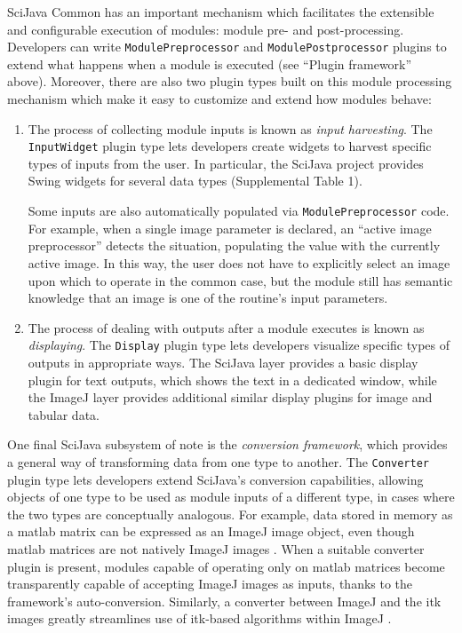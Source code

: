 \documentclass{bmcart}
\begin{document}
SciJava Common has an important mechanism which facilitates the extensible and
configurable execution of modules: module pre- and post-processing. Developers
can write \texttt{ModulePreprocessor} and \texttt{ModulePostprocessor} plugins
to extend what happens when a module is executed (see ``Plugin framework''
above). Moreover, there are also two plugin types built on this module
processing mechanism which make it easy to customize and extend how modules
behave:

\begin{enumerate}
  \item {The process of collecting module inputs is known as \textit{input
    harvesting}. The \texttt{InputWidget} plugin type lets developers create
    widgets to harvest specific types of inputs from the user. In particular,
    the SciJava project provides Swing widgets for several data types
    (Supplemental Table 1).

    Some inputs are also automatically populated via
    \texttt{ModulePreprocessor} code. For example, when a single image
    parameter is declared, an ``active image preprocessor'' detects the
    situation, populating the value with the currently active image. In this
    way, the user does not have to explicitly select an image upon which to
    operate in the common case, but the module still has semantic knowledge
    that an image is one of the routine's input parameters.}
  \item The process of dealing with outputs after a module executes is known as
    \textit{displaying}. The \texttt{Display} plugin type lets developers
    visualize specific types of outputs in appropriate ways. The SciJava layer
    provides a basic display plugin for text outputs, which shows the text in a
    dedicated window, while the ImageJ layer provides additional similar
    display plugins for image and tabular data.
\end{enumerate}

One final SciJava subsystem of note is the \textit{conversion framework}, which
provides a general way of transforming data from one type to another. The
\texttt{Converter} plugin type lets developers extend SciJava's conversion
capabilities, allowing objects of one type to be used as module inputs of a
different type, in cases where the two types are conceptually analogous. For
example, data stored in memory as a \acrfull{matlab} matrix can be expressed as
an ImageJ image object, even though \acrshort{matlab} matrices are not natively
ImageJ images \cite{imagej_matlab}. When a suitable converter plugin is
present, modules capable of operating only on \acrshort{matlab} matrices become
transparently capable of accepting ImageJ images as inputs, thanks to the
framework's auto-conversion. Similarly, a converter between ImageJ and the
\acrfull{itk} \cite{itk} images greatly streamlines use of \acrshort{itk}-based
algorithms within ImageJ \cite{imagej_itk}.
\end{document}
